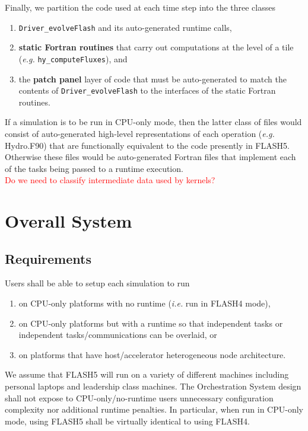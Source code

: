 \documentclass{article}
\begin{document}
Finally, we partition the code used at each time step into the three classes
\begin{enumerate}
\item{\texttt{Driver\_evolveFlash} and its auto-generated runtime calls,}
\item{\textbf{static Fortran routines} that carry out computations at the
level of a tile (\textit{e.g.} \texttt{hy\_computeFluxes}), and}
\item{the \textbf{patch panel} layer of code that must be auto-generated to
match the contents of \texttt{Driver\_evolveFlash} to the interfaces of the
static Fortran routines.}
\end{enumerate}
If a simulation is to be run in CPU-only mode, then the latter class of files
would consist of auto-generated high-level representations of each operation
(\textit{e.g.} Hydro.F90) that are functionally equivalent to the code presently
in FLASH5.  Otherwise these files would be auto-generated Fortran files that
implement each of the tasks being passed to a runtime execution.\\

\textcolor{red}{Do we need to classify intermediate data used by kernels?}

\section{Overall System}
\subsection{Requirements}
Users shall be able to setup each simulation to run
\begin{enumerate}
\item{on CPU-only platforms with no runtime (\textit{i.e.} run in FLASH4 mode),}
\item{on CPU-only platforms but with a runtime so that independent tasks or
independent tasks/communications can be overlaid, or}
\item{on platforms that have host/accelerator heterogeneous node architecture.}
\end{enumerate}

We assume that FLASH5 will run on a variety of different machines including
personal laptops and leadership class machines.  The Orchestration System design
shall not expose to CPU-only/no-runtime users unnecessary configuration
complexity nor additional runtime penalties.  In particular, when run in
CPU-only mode, using FLASH5 shall be virtually identical to using FLASH4.\\
\end{document}
